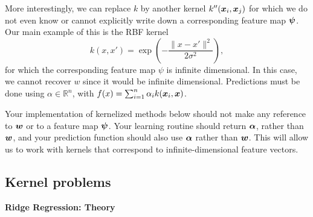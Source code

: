 \documentclass{article}
\newcommand{\nyuparagrah}[1]{\textcolor{nyupurple}{\large #1}}
\theoremstyle{plain}
\theoremstyle{definition}
\begin{document}
More interestingly, we can replace $k$ by another kernel $k''(\boldsymbol{x}_{i}, \boldsymbol{x}_{j})$
for which we do not even know or cannot explicitly write down a corresponding
feature map $\boldsymbol{\psi}$. Our main example of this is the RBF kernel
\[
k(x,x')=\exp\left(-\frac{\|x-x'\|^{2}}{2\sigma^{2}}\right),
\]
for which the corresponding feature map $\psi$ is infinite dimensional.
In this case, we cannot recover $w$ since it would be infinite dimensional.
Predictions must be done using $\alpha\in\mathbb{R}^{n}$, with $f(x)=\sum_{i=1}^{n}\alpha_{i}k(\boldsymbol{x}_{i}, \boldsymbol{x})$. 

Your implementation of kernelized methods below should not make any
reference to $\boldsymbol{w}$ or to a feature map $\boldsymbol{\psi}$. Your learning
routine should return $\boldsymbol{\alpha}$, rather than $\boldsymbol{w}$, and your prediction
function should also use $\boldsymbol{\alpha}$ rather than $\boldsymbol{w}$. This will allow
us to work with kernels that correspond to infinite-dimensional feature
vectors.

\subsection{Kernel problems}

\nyuparagrah{\bf Ridge Regression: Theory}
\end{document}
